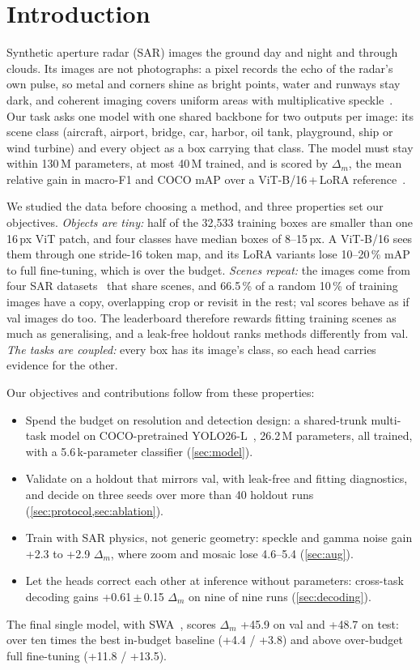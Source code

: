 \section{Introduction}
\label{sec:intro}

Synthetic aperture radar (SAR) images the ground day and night and through clouds.
Its images are not photographs: a pixel records the echo of the radar's own pulse, so metal and corners shine as bright
points, water and runways stay dark, and coherent imaging covers uniform areas with multiplicative
speckle~\cite{argenti2013speckle}.
Our task asks one model with one shared backbone for two outputs per image: its scene class (aircraft, airport,
bridge, car, harbor, oil tank, playground, ship or wind turbine) and every object as a box carrying that class.
The model must stay within 130\,M parameters, at most 40\,M trained, and is scored by $\Delta_m$, the mean relative
gain in macro-F1 and COCO mAP over a ViT-B/16\,+\,LoRA reference~\cite{maninis2019attentive,vandenhende2021mtl}.

We studied the data before choosing a method, and three properties set our objectives.
\emph{Objects are tiny:} half of the 32{,}533 training boxes are smaller than one 16\,px ViT patch, and four classes
have median boxes of 8--15\,px.
A ViT-B/16 sees them through one stride-16 token map, and its LoRA variants lose 10--20\,\% mAP to full fine-tuning,
which is over the budget.
\emph{Scenes repeat:} the images come from four SAR datasets~\cite{li2024sardet,zhang2025rsar,wang2025m4sar,wei2020hrsid}
that share scenes, and 66.5\,\% of a random 10\,\% of training images have a copy, overlapping crop or revisit in the
rest; val scores behave as if val images do too.
The leaderboard therefore rewards fitting training scenes as much as generalising, and a leak-free holdout ranks
methods differently from val.
\emph{The tasks are coupled:} every box has its image's class, so each head carries evidence for the other.

Our objectives and contributions follow from these properties:
\begin{itemize}[nosep,leftmargin=*]
\item Spend the budget on resolution and detection design: a shared-trunk multi-task model on COCO-pretrained
      YOLO26-L~\cite{jocher2026yolo26}, 26.2\,M parameters, all trained, with a 5.6\,k-parameter classifier
      (\cref{sec:model}).
\item Validate on a holdout that mirrors val, with leak-free and fitting diagnostics, and decide on three seeds over
      more than 40 holdout runs (\cref{sec:protocol,sec:ablation}).
\item Train with SAR physics, not generic geometry: speckle and gamma noise gain +2.3 to +2.9 $\Delta_m$, where zoom
      and mosaic lose 4.6--5.4 (\cref{sec:aug}).
\item Let the heads correct each other at inference without parameters: cross-task decoding gains
      +0.61\,$\pm$\,0.15 $\Delta_m$ on nine of nine runs (\cref{sec:decoding}).
\end{itemize}
The final single model, with SWA~\cite{izmailov2018swa}, scores $\Delta_m$ +45.9 on val and +48.7 on test: over ten
times the best in-budget baseline (+4.4 / +3.8) and above over-budget full fine-tuning (+11.8 / +13.5).
